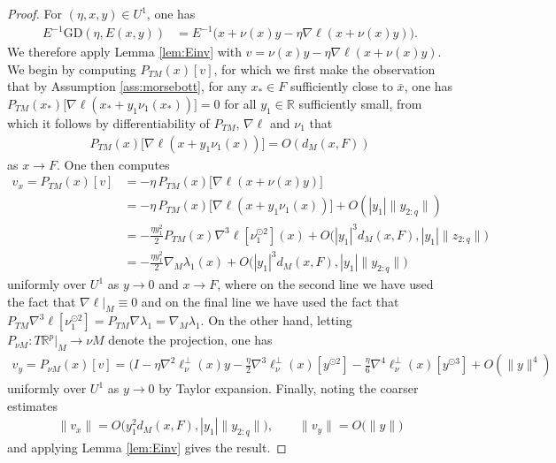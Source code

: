 \documentclass{article}
\newcommand{\RB}{\mathbb{R}}
\newcommand{\GD}{\mathrm{GD}}
\theoremstyle{plain}
\theoremstyle{definition}
\theoremstyle{remark}
\begin{document}
\begin{proof}
    For $(\eta,x,y)\in U^1$, one has
    \begin{align}
    E^{-1}\GD(\eta,E(x,y)) &= E^{-1}\big(x + \nu(x)y-\eta\nabla\ell(x + \nu(x)y)\big).
    \end{align}
    We therefore apply Lemma \ref{lem:Einv} with $v = \nu(x)y-\eta\nabla\ell(x + \nu(x)y)$. We begin by computing $P_{TM}(x)[v]$, for which we first make the observation that by Assumption \ref{ass:morsebott}, for any $x_*\in F$ sufficiently close to $\bar{x}$, one has $P_{TM}(x_*)\big[\nabla\ell(x_* + y_1\nu_1(x_*))\big] = 0$ for all $y_1\in\RB$ sufficiently small, from which it follows by differentiability of $P_{TM}$, $\nabla\ell$ and $\nu_1$ that
    \begin{align}
    P_{TM}(x)\big[\nabla\ell(x + y_1\nu_1(x))\big] = O(d_M(x,F))
    \end{align}
    as $x\rightarrow F$. One then computes
    \begin{align}
        v_x = P_{TM}(x)[v] &= -\eta\, P_{TM}(x)\big[\nabla\ell(x + \nu(x)y)\big]\\&=-\eta \,P_{TM}(x)\big[\nabla\ell(x+y_1\nu_1(x))\big] + O(|y_1|\|y_{2:q}\|)\\&=-\frac{\eta y_1^2}{2}P_{TM}(x)\nabla^3\ell[\nu_1^{\odot 2}](x) + O\big(|y_1|^3d_M(x,F),|y_1|\|z_{2:q}\|\big)\\&=-\frac{\eta y_1^2}{2}\nabla_M\lambda_1(x) + O\big(|y_1|^3d_M(x,F),|y_1|\|y_{2:q}\|\big)
    \end{align}
    uniformly over $U^1$ as $y\rightarrow 0$ and $x\rightarrow F$, where on the second line we have used the fact that $\nabla\ell|_M\equiv 0$ and on the final line we have used the fact that $P_{TM}\nabla^3\ell[\nu_1^{\odot 2}] = P_{TM}\nabla\lambda_1 = \nabla_M\lambda_1$. On the other hand, letting $P_{\nu M}:T\RB^p|_M\rightarrow \nu M$ denote the projection, one has
    \begin{align}
    v_y = P_{\nu M}(x)[v] = (I-\eta\nabla^2\ell^{\perp}_{\nu}(x)y-\frac{\eta}{2}\nabla^3\ell^{\perp}_{\nu}(x)[y^{\odot 2}]-\frac{\eta}{6}\nabla^4\ell^{\perp}_{\nu}(x)[y^{\odot 3}] + O(\|y\|^4)
    \end{align}
    uniformly over $U^1$ as $y\rightarrow 0$ by Taylor expansion. Finally, noting the coarser estimates
    \begin{align}
    \|v_x\| = O\big(y_1^2d_M(x,F),|y_1|\|y_{2:q}\|\big),\qquad \|v_y\| = O\big(\|y\|\big)
    \end{align}
    and applying Lemma \ref{lem:Einv} gives the result.
\end{proof}
\end{document}
